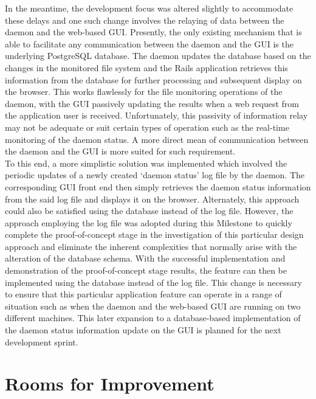 \documentclass{article}
\begin{document}
In the meantime, the development focus was altered slightly to accommodate these delays and one such change involves the relaying of data between the daemon and the web-based GUI. Presently, the only existing mechanism that is able to facilitate any communication between the daemon and the GUI is the underlying PostgreSQL database. The daemon updates the database based on the changes in the monitored file system and the Rails application retrieves this information from the database for further processing and subsequent display on the browser. This works flawlessly for the file monitoring operations of the daemon, with the GUI passively updating the results when a web request from the application user is received. Unfortunately, this passivity of information relay may not be adequate or suit certain types of operation such as the real-time monitoring of the daemon status. A more direct mean of communication between the daemon and the GUI is more suited for such requirement. \\

To this end, a more simplistic solution was implemented which involved the periodic updates of a newly created `daemon status' log file by the daemon. The corresponding GUI front end then simply retrieves the daemon status information from the said log file and displays it on the browser. Alternately, this approach could also be satisfied using the database instead of the log file. However, the approach employing the log file was adopted during this Milestone to quickly complete the proof-of-concept stage in the investigation of this particular design approach and eliminate the inherent complexities that normally arise with the alteration of the database schema. With the successful implementation and demonstration of the proof-of-concept stage results, the feature can then be implemented using the database instead of the log file. This change is necessary to ensure that this particular application feature can operate in a range of situation such as when the daemon and the web-based GUI are running on two different machines. This later expansion to a database-based implementation of the daemon status information update on the GUI is planned for the next development sprint.


\section*{Rooms for Improvement}
\end{document}
